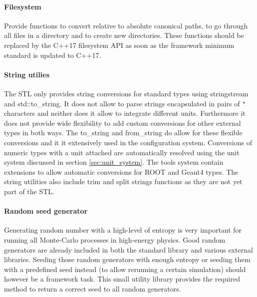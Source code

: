 \paragraph{Filesystem}
\label{sec:filesystem}
Provide functions to convert relative to absolute canonical paths, to go through all files in a directory and to create new directories. These functions should be replaced by the C++17 filesystem API\cite{cppfilesystem} as soon as the framework minimum standard is updated to C++17.

\paragraph{String utilies}
\label{sec:string_utilities}
The STL only provides string conversions for standard types using stringstream and std::to\_string. It does not allow to parse strings encapsulated in pairs of \texttt{"} characters and neither does it allow to integrate different units. Furthermore it does not provide wide flexibility to add custom conversions for other external types in both ways. The \apsq to\_string and from\_string do allow for these flexible conversions and it it extensively used in the configuration system. Conversions of numeric types with a unit attached are automatically resolved using the unit system discussed in section \ref{sec:unit_system}. The \apsq tools system contain extensions to allow automatic conversions for ROOT and Geant4 types. The string utilities also include trim and split strings functions as they are not yet part of the STL.

\paragraph{Random seed generator}
\label{sec:random_generator}
Generating random number with a high-level of entropy is very important for running all Monte-Carlo processes in high-energy physics. Good random generators are already included in both the standard library and various external libraries. Seeding those random generators with enough entropy or seeding them with a predefined seed instead (to allow rerunning a certain simulation) should however be a framework task. This small utility library provides the required method to return a correct seed to all random generators.

